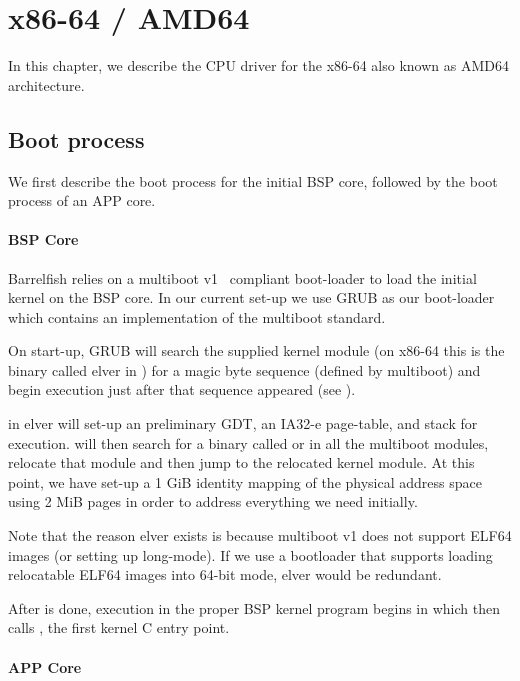 \documentclass[a4paper,11pt,twoside]{report}
\begin{document}
{{\chapter{x86-64 / AMD64}
\label{chap:x86}

In this chapter, we describe the CPU driver for the x86-64 also known as AMD64
architecture.

\section{Boot process}

We first describe the boot process for the initial BSP core, followed by
the boot process of an APP core.

\subsubsection{BSP Core}

Barrelfish relies on a multiboot v1~\cite{multiboot1} compliant boot-loader to
load the initial kernel on the BSP core. In our current set-up we use GRUB as
our boot-loader which contains an implementation of the multiboot standard.

On start-up, GRUB will search the supplied kernel module (on x86-64 this is the
binary called elver in ) for a magic byte sequence 
(defined by multiboot) and begin execution just after that sequence appeared
(see ).

 in elver will set-up an preliminary GDT, an IA32-e page-table, 
and stack for execution.  will then search for a
binary called  or  in all the multiboot
modules, relocate that module and then jump to the relocated kernel module. At
this point, we have set-up a 1 GiB identity mapping of the physical address
space using 2 MiB  pages in order to address everything we need initially.

Note that the reason elver exists is because multiboot v1 does not support
ELF64 images (or setting up long-mode). If we use a bootloader that supports
loading relocatable ELF64 images into 64-bit mode, elver would be redundant.

After  is done, execution in the proper BSP kernel program
begins in  which then calls 
, the first kernel C entry point.

\subsubsection{APP Core}

}}
\end{document}
